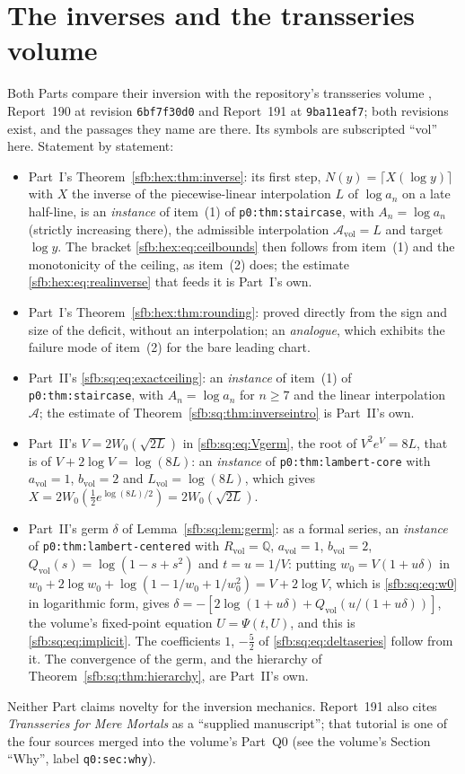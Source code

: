 \documentclass[11pt]{article}
\theoremstyle{remark}\newtheorem{remark}[theorem]{Remark}
\newcommand{\file}[1]{\nolinkurl{#1}}
\newcommand{\vol}{\mathrm{vol}}
\begin{document}
\section*{The inverses and the transseries volume}\label{sfb:sec:inverses}
Both Parts compare their inversion with the repository's transseries volume
\cite{tsvol}, Report~190 at revision \texttt{6bf7f30d0} and Report~191 at
\texttt{9ba11eaf7}; both revisions exist, and the passages they name are
there. Its symbols are subscripted ``vol'' here. Statement by statement:
\begin{itemize}
\item Part~I's Theorem~\ref{sfb:hex:thm:inverse}: its first step,
$N(y)=\lceil X(\log y)\rceil$ with $X$ the inverse of the piecewise-linear
interpolation $L$ of $\log a_n$ on a late half-line, is an \emph{instance} of
item~(1) of \file{p0:thm:staircase}, with $A_n=\log a_n$ (strictly increasing
there), the admissible interpolation $\mathcal A_\vol=L$ and target $\log y$.
The bracket \eqref{sfb:hex:eq:ceilbounds} then follows from item~(1) and the
monotonicity of the ceiling, as item~(2) does; the estimate
\eqref{sfb:hex:eq:realinverse} that feeds it is Part~I's own.
\item Part~I's Theorem~\ref{sfb:hex:thm:rounding}: proved directly from the
sign and size of the deficit, without an interpolation; an \emph{analogue},
which exhibits the failure mode of item~(2) for the bare leading chart.
\item Part~II's \eqref{sfb:sq:eq:exactceiling}: an \emph{instance} of item~(1)
of \file{p0:thm:staircase}, with $A_n=\log a_n$ for $n\ge7$ and the linear
interpolation $\mathcal A$; the estimate of
Theorem~\ref{sfb:sq:thm:inverseintro} is Part~II's own.
\item Part~II's $V=2W_0(\sqrt{2L})$ in \eqref{sfb:sq:eq:Vgerm}, the root of
$V^2e^V=8L$, that is of $V+2\log V=\log(8L)$: an \emph{instance} of
\file{p0:thm:lambert-core} with $a_\vol=1$, $b_\vol=2$ and $L_\vol=\log(8L)$,
which gives $X=2W_0(\tfrac12e^{\log(8L)/2})=2W_0(\sqrt{2L})$.
\item Part~II's germ $\delta$ of Lemma~\ref{sfb:sq:lem:germ}: as a formal
series, an \emph{instance} of \file{p0:thm:lambert-centered} with $R_\vol=\mathbb
Q$, $a_\vol=1$, $b_\vol=2$, $Q_\vol(s)=\log(1-s+s^2)$ and $t=u=1/V$: putting
$w_0=V(1+u\delta)$ in $w_0+2\log w_0+\log(1-1/w_0+1/w_0^2)=V+2\log V$, which
is \eqref{sfb:sq:eq:w0} in logarithmic form, gives
$\delta=-[2\log(1+u\delta)+Q_\vol(u/(1+u\delta))]$, the volume's fixed-point
equation $U=\Psi(t,U)$, and this is \eqref{sfb:sq:eq:implicit}. The
coefficients $1$, $-\frac52$ of \eqref{sfb:sq:eq:deltaseries} follow from it.
The convergence of the germ, and the hierarchy of
Theorem~\ref{sfb:sq:thm:hierarchy}, are Part~II's own.
\end{itemize}
Neither Part claims novelty for the inversion mechanics. Report~191 also
cites \emph{Transseries for Mere Mortals} as a ``supplied manuscript''; that
tutorial is one of the four sources merged into the volume's Part~Q0 (see the
volume's Section ``Why'', label \file{q0:sec:why}).
\end{document}
